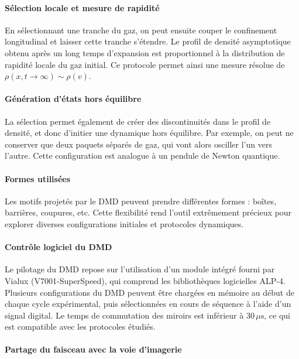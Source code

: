 \paragraph{Sélection locale et mesure de rapidité}

En sélectionnant une tranche du gaz, on peut ensuite couper le confinement longitudinal et laisser cette tranche s’étendre. Le profil de densité asymptotique obtenu après un long temps d’expansion est proportionnel à la distribution de rapidité locale du gaz initial. Ce protocole permet ainsi une mesure résolue de \(\rho(x,t \to \infty) \sim \rho(v)\).

\paragraph{Génération d’états hors équilibre}

La sélection permet également de créer des discontinuités dans le profil de densité, et donc d’initier une dynamique hors équilibre. Par exemple, on peut ne conserver que deux paquets séparés de gaz, qui vont alors osciller l’un vers l’autre. Cette configuration est analogue à un pendule de Newton quantique.

\paragraph{Formes utilisées}

Les motifs projetés par le DMD peuvent prendre différentes formes : boîtes, barrières, coupures, etc. Cette flexibilité rend l’outil extrêmement précieux pour explorer diverses configurations initiales et protocoles dynamiques.

\paragraph{Contrôle logiciel du DMD}

Le pilotage du DMD repose sur l’utilisation d’un module intégré fourni par Vialux (V7001-SuperSpeed), qui comprend les bibliothèques logicielles ALP-4. Plusieurs configurations du DMD peuvent être chargées en mémoire au début de chaque cycle expérimental, puis sélectionnées en cours de séquence à l’aide d’un signal digital. Le temps de commutation des miroirs est inférieur à \(30\,\mu\mathrm{s}\), ce qui est compatible avec les protocoles étudiés.

\paragraph{Partage du faisceau avec la voie d’imagerie}

